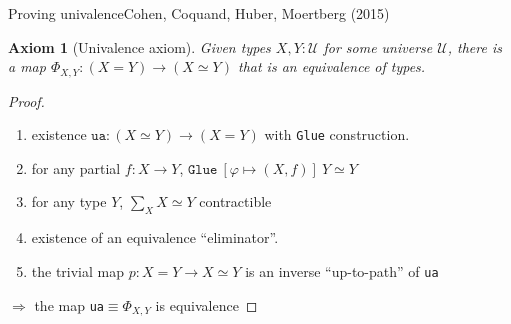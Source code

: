 \documentclass[english]{beamer}
\newtheorem{axiom}[theorem]{Axiom}
\newcommand{\fig}[2]{
    \begin{figure}\begin{center}\texttt{[image: figures/\#1]}\caption{#2\label{#1}}\end{center}
    \end{figure}}
\begin{document}
  

  


  
 




\begin{frame}{Proving univalence}{Cohen, Coquand, Huber, Moertberg (2015)}

\begin{axiom}[Univalence axiom]
 Given types $X,Y : \mathcal{U}$ for some universe $\mathcal{U}$, there is a map  $\Phi_{X,Y}: (X=Y) \rightarrow (X \simeq Y)$ that is an equivalence of types. 
\end{axiom}


 

\begin{proof}

\begin{enumerate}

\item existence $\texttt{ua} : (X\simeq Y) \rightarrow (X = Y)$ with \texttt{Glue} construction.

\item for any partial $f : X \rightarrow Y$, $\texttt{Glue} \ [\varphi \mapsto (X, f)] \ Y \simeq Y$

\item for any type $Y$, $\sum_{X} X \simeq Y$ contractible

\item existence of an equivalence ``eliminator''.

\item the trivial map $p : X = Y \rightarrow X \simeq Y$ is an inverse ``up-to-path'' of \texttt{ua}
%  
%  
 
 \end{enumerate}
 
    $\Rightarrow$ the map \texttt{ua}$\equiv \Phi_{X,Y}$ is equivalence
\end{proof} 

\end{frame}
\end{document}
